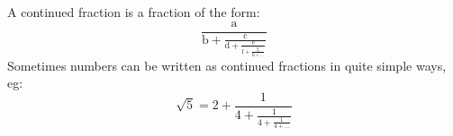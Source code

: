 A continued fraction is a fraction of the form:
\[ \frac{\mathrm{a}}{\mathrm{b} + \frac{\mathrm{c}}{\mathrm{d} +
 \frac{\mathrm{e}}{\mathrm{f}+ \frac{\mathrm{g}}{\mathrm{h}+ ...}}}} \]
Sometimes numbers can be written as continued fractions in quite simple ways, eg:
\[ \sqrt{5}= 2 + \frac{1}{4 + \frac{1}{4 + \frac{1}{4 + ...}}} \]
